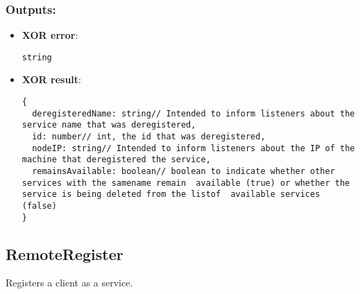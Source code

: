 \subsubsection*{Outputs:}
\begin{itemize}
    \item \textbf{XOR error}: 
\begin{lstlisting}
string
\end{lstlisting}
    \item \textbf{XOR result}: 
\begin{lstlisting}
{
  deregisteredName: string// Intended to inform listeners about the service name that was deregistered, 
  id: number// int, the id that was deregistered, 
  nodeIP: string// Intended to inform listeners about the IP of the machine that deregistered the service, 
  remainsAvailable: boolean// boolean to indicate whether other services with the samename remain  available (true) or whether the service is being deleted from the listof  available services (false)
}
\end{lstlisting}
  \end{itemize}

\subsection{RemoteRegister}
\label{ch:builtinservices:RemoteRegister}
Registers a client as a service.
